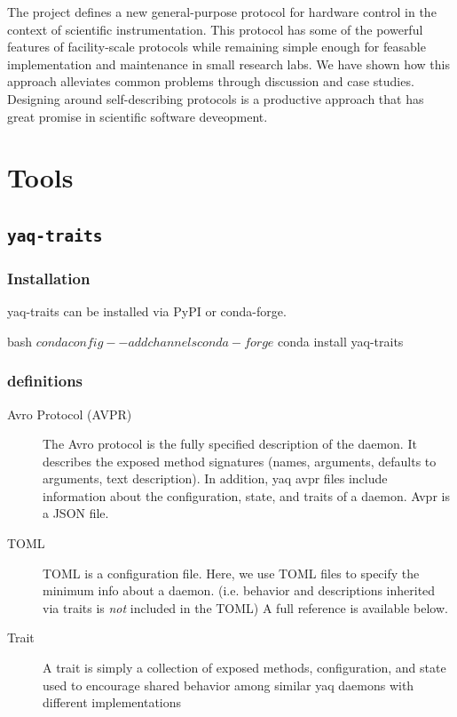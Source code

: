 The \yaq{} project defines a new general-purpose protocol for hardware control in the context of scientific instrumentation.
This protocol has some of the powerful features of facility-scale protocols while remaining simple enough for feasable implementation and maintenance in small research labs.
We have shown how this approach alleviates common problems through discussion and case studies.
Designing around self-describing protocols is a productive approach that has great promise in scientific software deveopment.


\clearpage

\section{Tools}

\subsection{\texttt{yaq-traits}}

\hypertarget{installation}{%
\subsubsection{Installation}}

yaq-traits can be installed via PyPI\cite{yaq-traits} or conda-forge\cite{yaq-traits-conda}.


\begin{codefragment}{bash}
$ conda config --add channels conda-forge
$ conda install yaq-traits
\end{codefragment}

\hypertarget{definitions}{%
\subsubsection{definitions}\label{definitions}}

\begin{description}
\item[Avro Protocol (AVPR)\cite{avpr}]
The Avro protocol is the fully specified description of the daemon. It
describes the exposed method signatures (names, arguments, defaults to
arguments, text description). In addition, yaq avpr files include
information about the configuration, state, and traits of a daemon. Avpr
is a JSON file.
\item[TOML\cite{TOML}]
TOML is a configuration file. Here, we use TOML files to specify the
minimum info about a daemon. (i.e. behavior and descriptions inherited
via traits is \emph{not} included in the TOML) A full reference is
available below.
\item[Trait\cite{yaq-traits-list}]
A trait is simply a collection of exposed methods, configuration, and
state used to encourage shared behavior among similar yaq daemons with
different implementations
\end{description}

